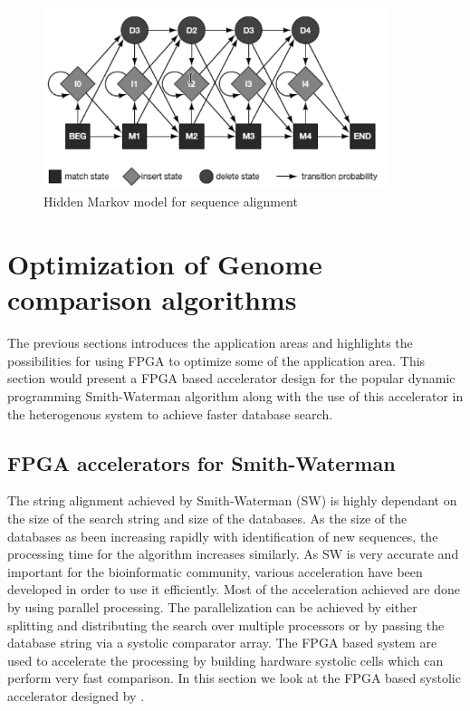 \documentclass[12pt,twoside]{article}
\begin{document}
\begin{figure}%
    \centering
    \includegraphics[width=0.9\textwidth]{fig/hmm}
    \caption{Hidden Markov model for sequence alignment \cite[Figure 4.16]{mount_bioinformatics:_2004}}
    \label{fig:hmm}
\end{figure}

\section{Optimization of Genome comparison algorithms}
\label{sec:designtech}

The previous sections introduces the application areas and highlights the possibilities for using FPGA to optimize some of the application
area. This section would present a FPGA based accelerator design for the popular dynamic programming Smith-Waterman algorithm along
with the use of this accelerator in the heterogenous system to achieve faster database search.

\subsection{FPGA accelerators for Smith-Waterman}
\label{fpgaaccelerator}

The string alignment achieved by Smith-Waterman (SW) is highly dependant on the size of the search string and size of the databases.
As the size of the databases as been increasing rapidly with identification of new sequences, the processing time for the algorithm
increases similarly. As SW is very accurate and important for the bioinformatic community, various acceleration have been developed
in order to use it efficiently. Most of the acceleration achieved are done by using parallel processing. The parallelization can be achieved
by either splitting and distributing the search over multiple processors \cite{martins_multithreaded_2000, boukerche_parallel_2005, schmidt_massively_2002, rucci_smith-waterman_2014}
or by passing the database string via a systolic comparator array. The FPGA based system are used to accelerate the processing by 
building hardware systolic cells which can perform very fast comparison. In this section we look at the FPGA based systolic accelerator
designed by \textcite{oliver_hyper_2005}.
\end{document}
